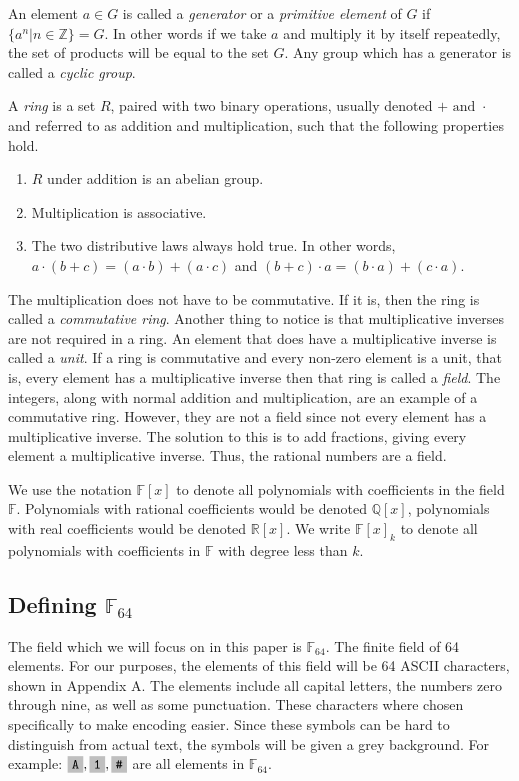 \documentclass{article}
\begin{document}
An element $a \in G$ is called a \textit{generator} or a \textit{primitive element} of $G$ if $\{a^{n} | n \in \mathbb{Z}\} = G$. In other words if we take $a$ and multiply it by itself repeatedly, the set of products will be equal to the set $G$. Any group which has a generator is called a \textit{cyclic group}.

A \textit{ring} is a set $R$, paired with two binary operations, usually denoted $+ \text{ and } \cdot$ and referred to as addition and multiplication, such that the following properties hold.
\begin{enumerate}
  \item $R$ under addition is an abelian group.
  \item Multiplication is associative.
  \item The two distributive laws always hold true. In other words, $a \cdot (b + c) = (a \cdot b) + (a \cdot c)$ and $(b + c) \cdot a = (b \cdot a) + (c \cdot a)$.
\end{enumerate}
The multiplication does not have to be commutative. If it is, then the ring is called a \textit{commutative ring}. Another thing to notice is that multiplicative inverses are not required in a ring. An element that does have a multiplicative inverse is called a \textit{unit}. If a ring is commutative and every non-zero element is a unit, that is, every element has a multiplicative inverse then that ring is called a \textit{field}. The integers, along with normal addition and multiplication, are an example of a commutative ring. However, they are not a field since not every element has a multiplicative inverse. The solution to this is to add fractions, giving every element a multiplicative inverse. Thus, the rational numbers are a field. 

We use the notation $\mathbb{F}[x]$ to denote all polynomials with coefficients in the field $\mathbb{F}$. Polynomials with rational coefficients would be denoted $\mathbb{Q}[x]$, polynomials with real coefficients would be denoted $\mathbb{R}[x]$. We write $\mathbb{F}[x]_{k}$ to denote all polynomials with coefficients in $\mathbb{F}$ with degree less than $k$.

\subsection{Defining $\mathbb{F}_{64}$}
The field which we will focus on in this paper is $\mathbb{F}_{64}$. The finite field of 64 elements.
For our purposes, the elements of this field will be 64 ASCII characters, shown in Appendix A. The elements include all capital letters, the numbers zero through nine, as well as some punctuation. These characters where chosen specifically to make encoding easier. Since these symbols can be hard to distinguish from actual text, the symbols will be given a grey background. For example: $\f{A}, \f{1}, \f{\#}$ are all elements in $\mathbb{F}_{64}$.
\end{document}
